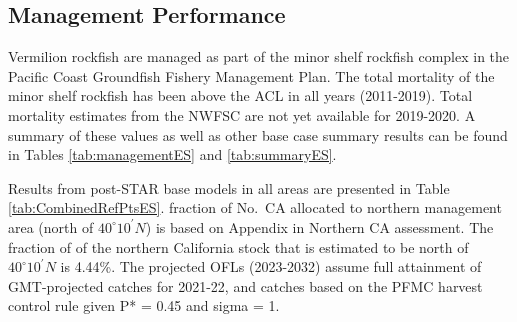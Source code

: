 \documentclass[11pt,
  english,
  a4paper,
]{article}
\begin{document}
\FloatBarrier


\hypertarget{management-performance}{%
\subsection*{Management Performance}\label{management-performance}}

\leavevmode\tagmcend\tagstructend

Vermilion rockfish are managed as part of the minor shelf rockfish complex in the Pacific Coast Groundfish Fishery Management Plan. The total mortality of the minor shelf rockfish has been above the ACL in all years (2011-2019). Total mortality estimates from the NWFSC are not yet available for 2019-2020. A summary of these values as well as other base case summary results can be found in Tables \ref{tab:managementES} and \ref{tab:summaryES}.

Results from post-STAR base models in all areas are presented in Table \ref{tab:CombinedRefPtsES}. fraction of No.~CA allocated to northern management area (north of $40^\circ 10^\prime N$) is based on Appendix in Northern CA assessment. The fraction of of the northern California stock that is estimated to be north of $40^\circ 10^\prime N$  is 4.44\%. The projected OFLs (2023-2032) assume full attainment of GMT-projected catches for 2021-22, and catches based on the PFMC harvest control rule given P* = 0.45 and sigma = 1.
\end{document}
